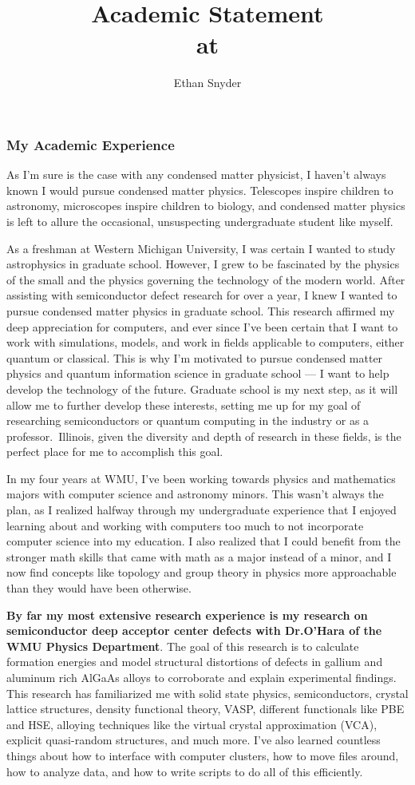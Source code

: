 \documentclass[11pt]{article}
\title{\vspace{-5em}Academic Statement\\
	\large \dept{} at \school{}}
\author{Ethan Snyder}
\date{}
\newcommand{\schoolabbr}{Illinois}
\begin{document}
\maketitle
\subsubsection*{My Academic Experience}
As I'm sure is the case with any condensed matter physicist, I haven't always known I would pursue condensed matter physics. Telescopes inspire children to astronomy, microscopes inspire children to biology, and condensed matter physics is left to allure the occasional, unsuspecting undergraduate student like myself.

As a freshman at Western Michigan University, I was certain I wanted to study astrophysics in graduate school. However, I grew to be fascinated by the physics of the small and the physics governing the technology of the modern world. After assisting with semiconductor defect research for over a year, I knew I wanted to pursue condensed matter physics in graduate school. This research affirmed my deep appreciation for computers, and ever since I've been certain that I want to work with simulations, models, and work in fields applicable to computers, either quantum or classical. This is why I'm motivated to pursue condensed matter physics and quantum information science in graduate school --- I want to help develop the technology of the future. Graduate school is my next step, as it will allow me to further develop these interests, setting me up for my goal of researching semiconductors or quantum computing in the industry or as a professor.\ \schoolabbr{}, given the diversity and depth of research in these fields, is the perfect place for me to accomplish this goal.

In my four years at WMU, I've been working towards physics and mathematics majors with computer science and astronomy minors. This wasn't always the plan, as I realized halfway through my undergraduate experience that I enjoyed learning about and working with computers too much to not incorporate computer science into my education. I also realized that I could benefit from the stronger math skills that came with math as a major instead of a minor, and I now find concepts like topology and group theory in physics more approachable than they would have been otherwise.

\textbf{By far my most extensive research experience is my research on semiconductor deep acceptor center defects with Dr.\@ O'Hara of the WMU Physics Department}. The goal of this research is to calculate formation energies and model structural distortions of defects in gallium and aluminum rich AlGaAs alloys to corroborate and explain experimental findings. This research has familiarized me with solid state physics, semiconductors, crystal lattice structures, density functional theory, VASP, different functionals like PBE and HSE, alloying techniques like the virtual crystal approximation (VCA), explicit quasi-random structures, and much more. I've also learned countless things about how to interface with computer clusters, how to move files around, how to analyze data, and how to write scripts to do all of this efficiently.
\end{document}
